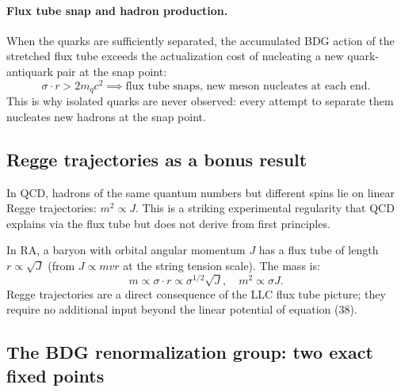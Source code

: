 \documentclass[11pt]{article}
\begin{document}
\paragraph{Flux tube snap and hadron production.} When the quarks are sufficiently separated, the accumulated BDG action of the stretched flux tube exceeds the actualization cost of nucleating a new quark-antiquark pair at the snap point:
\begin{equation}
\sigma\cdot r > 2m_q c^2 \implies \text{flux tube snaps, new meson nucleates at each end.}
\end{equation}
This is why isolated quarks are never observed: every attempt to separate them nucleates new hadrons at the snap point.

\subsection{Regge trajectories as a bonus result}

In QCD, hadrons of the same quantum numbers but different spins lie on linear Regge trajectories: $m^2\propto J$. This is a striking experimental regularity that QCD explains via the flux tube but does not derive from first principles.

In RA, a baryon with orbital angular momentum $J$ has a flux tube of length $r\propto\sqrt{J}$ (from $J\propto mvr$ at the string tension scale). The mass is:
\begin{equation}
m\propto\sigma\cdot r\propto\sigma^{1/2}\sqrt{J},\quad m^2\propto\sigma J.
\end{equation}
Regge trajectories are a direct consequence of the LLC flux tube picture; they require no additional input beyond the linear potential of equation (38).

\subsection{The BDG renormalization group: two exact fixed points}
\end{document}
